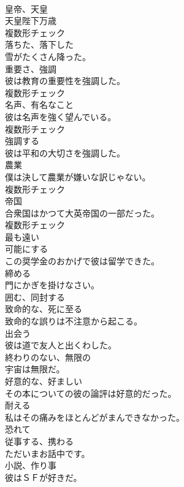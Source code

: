 \documentclass[8pt]{extreport}
\begin{document}
\begin{CJK}{UTF8}{min}
\\	[名詞]	皇帝、天皇	
\\	天皇陛下万歳	
\\	複数形チェック
\\	[形容詞]	落ちた、落下した	
\\	雪がたくさん降った。	
\\	[名詞]	重要さ、強調	
\\	彼は教育の重要性を強調した。	
\\	複数形チェック
\\	[名詞]	名声、有名なこと	
\\	彼は名声を強く望んでいる。	
\\	複数形チェック
\\	[動詞]	強調する	
\\	彼は平和の大切さを強調した。	
\\	[名詞]	農業	
\\	僕は決して農業が嫌いな訳じゃない。	
\\	複数形チェック
\\	[名詞]	帝国	
\\	合衆国はかつて大英帝国の一部だった。	
\\	複数形チェック
\\	[形容詞]	最も遠い	
\\	[動詞]	可能にする	
\\	この奨学金のおかげで彼は留学できた。	
\\	[動詞]	締める	
\\	門にかぎを掛けなさい。	
\\	[動詞]	囲む、同封する	
\\	[形容詞]	致命的な、死に至る	
\\	致命的な誤りは不注意から起こる。	
\\	[動詞]	出会う	
\\	彼は道で友人と出くわした。	
\\	[形容詞]	終わりのない、無限の	
\\	宇宙は無限だ。	
\\	[形容詞]	好意的な、好ましい	
\\	その本についての彼の論評は好意的だった。	
\\	[動詞]	耐える	
\\	私はその痛みをほとんどがまんできなかった。	
\\	[形容詞]	恐れて	
\\	[動詞]	従事する、携わる	
\\	ただいまお話中です。	
\\	[名詞]	小説、作り事	
\\	彼はＳＦが好きだ。	

\end{CJK}
\end{document}
